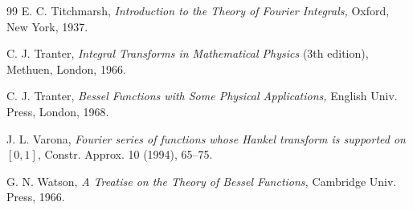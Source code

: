 \documentclass[12pt,leqno]{amsart}
\theoremstyle{plain}
\begin{document}
\begin{thebibliography}{99}
 E. C. Titchmarsh,
\textit{Introduction to the Theory of Fourier Integrals,}
Oxford, New York, 1937.

 C. J. Tranter,
\textit{Integral Transforms in Mathematical Physics} (3th edition),
Methuen, London, 1966.

 C. J. Tranter,
\textit{Bessel Functions with Some Physical Applications,}
English Univ. Press, London, 1968.

 J. L. Varona,
\textit{Fourier series of functions whose Hankel transform is supported on
$[0,1]$},
{Constr. Approx.}
{10} (1994), 65--75.

 G. N. Watson,
\textit{A Treatise on the Theory of Bessel Functions,}
Cambridge Univ. Press, 1966.

\end{thebibliography}
\end{document}
